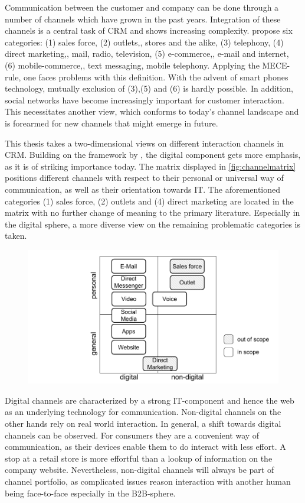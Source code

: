 		Communication between the customer and company can be done through a number of channels which have grown in the past years. Integration of these channels is a central task of CRM and shows increasing complexity. \cite{paynefrow2005} propose six categories: (1) sales force, (2) outlets,\ie, stores and the alike, (3) telephony, (4) direct marketing,\ie, mail, radio, television, (5) e-commerce,\ie, e-mail and internet, (6) mobile-commerce,\ie, text messaging, mobile telephony. Applying the \acrfull{MECE}-rule, one faces problems with this definition. With the advent of smart phones technology, mutually exclusion of (3),(5) and (6) is hardly possible. In addition, social networks have become increasingly important for customer interaction. This necessitates another view, which conforms to today's channel landscape and is forearmed for new channels that might emerge in future. 
		
		This thesis takes a two-dimensional views on different interaction channels in CRM. Building on the framework by \citeauthor{paynefrow2005}, the digital component gets more emphasis, as it is of striking importance today. The matrix displayed in \ref{fig:channelmatrix} positions different channels with respect to their personal or universal way of communication, as well as their orientation towards IT. The aforementioned categories (1) sales force, (2) outlets and (4) direct marketing are located in the matrix with no further change of meaning to the primary literature. Especially in the digital sphere, a more diverse view on the remaining problematic categories is taken.
		
				\begin{figure}[caption={Channel matrix}, label={fig:channelmatrix}]
			{	\includegraphics[width=.8\textwidth]{figures/channelmatrix.pdf}}
		\end{figure}
		
		
		
		Digital channels are characterized by a strong IT-component and hence the web as an underlying technology for communication. Non-digital channels on the other hands rely on real world interaction. In general, a shift towards digital channels can be observed. For consumers they are a convenient way of communication, as their devices enable them to do interact with less effort. A stop at a retail store is more effortful than a lookup of information on the company website. Nevertheless, non-digital channels will always be part of channel portfolio, as complicated issues reason interaction with another human being face-to-face especially in the B2B-sphere. 
		

